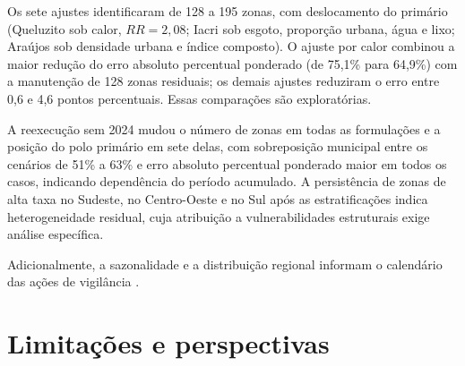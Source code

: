 Os sete ajustes identificaram de 128 a 195 zonas, com deslocamento do primário (Queluzito sob calor, $RR = 2{,}08$; Iacri sob esgoto, proporção urbana, água e lixo; Araújos sob densidade urbana e índice composto). O ajuste por calor combinou a maior redução do erro absoluto percentual ponderado (de 75,1\% para 64,9\%) com a manutenção de 128 zonas residuais; os demais ajustes reduziram o erro entre 0,6 e 4,6 pontos percentuais. Essas comparações são exploratórias.

A reexecução sem 2024 mudou o número de zonas em todas as formulações e a posição do polo primário em sete delas, com sobreposição municipal entre os cenários de 51\% a 63\% e erro absoluto percentual ponderado maior em todos os casos, indicando dependência do período acumulado. A persistência de zonas de alta taxa no Sudeste, no Centro-Oeste e no Sul após as estratificações indica heterogeneidade residual, cuja atribuição a vulnerabilidades estruturais exige análise específica.

Adicionalmente, a sazonalidade e a distribuição regional informam o calendário das ações de vigilância \cite{pescarini2022}.

\section{Limitações e perspectivas}

